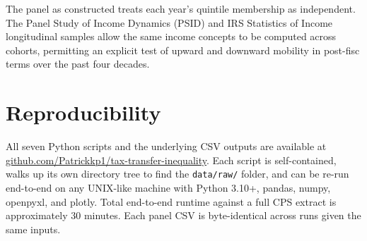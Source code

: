 \documentclass[11pt,letterpaper]{article}
\begin{document}
The panel as constructed treats each year's quintile membership as
independent. The Panel Study of Income Dynamics (PSID) and IRS Statistics of
Income longitudinal samples allow the same income concepts to be computed
across cohorts, permitting an explicit test of upward and downward mobility
in post-fisc terms over the past four decades.

\section{Reproducibility}

All seven Python scripts and the underlying CSV outputs are available at
\href{https://github.com/Patrickkp1/tax-transfer-inequality}{github.com/Patrickkp1/tax-transfer-inequality}.
Each script is
self-contained, walks up its own directory tree to find the
\texttt{data/raw/} folder, and can be re-run end-to-end on any UNIX-like
machine with Python 3.10+, pandas, numpy, openpyxl, and plotly. Total
end-to-end runtime against a full CPS extract is approximately 30 minutes.
Each panel CSV is byte-identical across runs given the same inputs.
\end{document}
